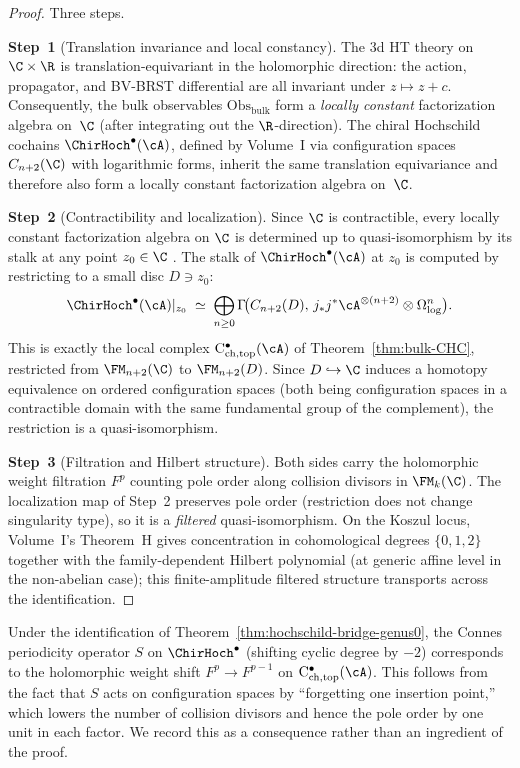 \begin{proof}
Three steps.

\textbf{Step~1} (Translation invariance and local constancy).
The 3d HT theory on $\C \times \R$ is translation-equivariant in
the holomorphic direction: the action, propagator, and BV-BRST
differential are all invariant under $z \mapsto z + c$.
Consequently, the bulk observables
$\mathrm{Obs}_{\mathrm{bulk}}$ form a \emph{locally constant}
factorization algebra on~$\C$ (after integrating out the
$\R$-direction). The chiral Hochschild cochains
$\ChirHoch^\bullet(\cA)$, defined by Volume~I via configuration
spaces $C_{n+2}(\C)$ with logarithmic forms, inherit the same
translation equivariance and therefore also form a locally
constant factorization algebra on~$\C$.

\textbf{Step~2} (Contractibility and localization).
Since $\C$ is contractible, every locally constant factorization
algebra on $\C$ is determined up to quasi-isomorphism by its
stalk at any point $z_0 \in \C$
\cite[Theorem~5.5.1.1]{CG17}. The stalk of
$\ChirHoch^\bullet(\cA)$ at $z_0$ is computed by restricting to a
small disc $D \ni z_0$:
\[
\ChirHoch^\bullet(\cA)|_{z_0}
\;\simeq\;
\bigoplus_{n \geq 0}
 \Gamma\!\bigl(
 C_{n+2}(D),\,
 j_\ast j^\ast \cA^{\otimes(n+2)}
 \otimes \Omega^n_{\log}
 \bigr).
\]
This is exactly the local complex
$\mathrm{C}^\bullet_{\mathrm{ch,top}}(\cA)$ of
Theorem~\ref{thm:bulk-CHC}, restricted from $\FM_{n+2}(\C)$ to
$\FM_{n+2}(D)$. Since $D \hookrightarrow \C$ induces a homotopy
equivalence on ordered configuration spaces (both being
configuration spaces in a contractible domain with the same
fundamental group of the complement), the restriction is a
quasi-isomorphism.

\textbf{Step~3} (Filtration and Hilbert structure).
Both sides carry the holomorphic weight filtration $F^p$ counting
pole order along collision divisors in $\FM_k(\C)$. The
localization map of Step~2 preserves pole order (restriction does
not change singularity type), so it is a \emph{filtered}
quasi-isomorphism. On the Koszul locus, Volume~I's Theorem~H
gives concentration in cohomological degrees $\{0,1,2\}$
together with the family-dependent Hilbert polynomial
\textup{(}at generic affine level in the non-abelian case\textup{)};
this finite-amplitude filtered structure transports across the
identification.
\end{proof}

\begin{remark}
Under the identification of
Theorem~\ref{thm:hochschild-bridge-genus0}, the Connes periodicity
operator $S$ on $\ChirHoch^\bullet$ (shifting cyclic degree by
$-2$) corresponds to the holomorphic weight shift
$F^p \to F^{p-1}$ on
$\mathrm{C}^\bullet_{\mathrm{ch,top}}(\cA)$. This follows from
the fact that $S$ acts on configuration spaces by ``forgetting one
insertion point,'' which lowers the number of collision divisors
and hence the pole order by one unit in each factor. We record
this as a consequence rather than an ingredient of the proof.
\end{remark}

